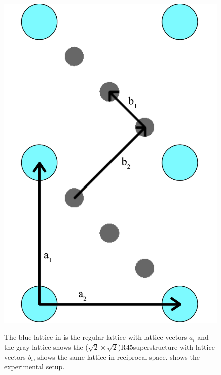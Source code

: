 \documentclass[a4paper,10pt]{scrartcl}
\begin{document}
\begin{figure}
{\includegraphics[scale=0.25]{img/superstructure2}
\label{fig:sup2}
}
\caption{The blue lattice in  is the regular lattice with lattice vectors $a_i$ and the gray lattice shows the ($\sqrt{2} \times \sqrt{2}$)R$45$\textdegree superstructure with lattice vectors $b_i$,  shows the same lattice in reciprocal space.  shows the experimental setup.}
\end{figure}
\end{document}
